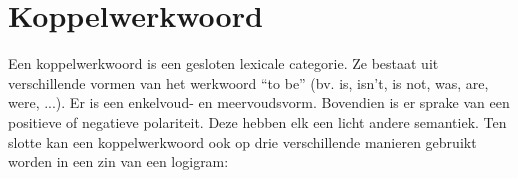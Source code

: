 






\section{Koppelwerkwoord}
Een koppelwerkwoord is een gesloten lexicale categorie. Ze bestaat uit verschillende vormen van het werkwoord ``to be'' (bv. is, isn't, is not, was, are, were, ...). Er is een enkelvoud- en meervoudsvorm. Bovendien is er sprake van een positieve of negatieve polariteit. Deze hebben elk een licht andere semantiek. Ten slotte kan een koppelwerkwoord ook op drie verschillende manieren gebruikt worden in een zin van een logigram:

